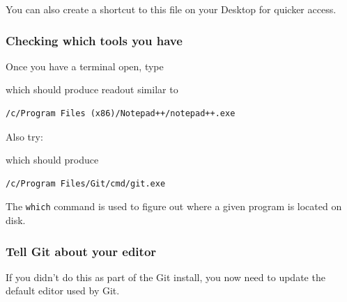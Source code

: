 You can also create a shortcut to this file on your Desktop for quicker
access.

\subsubsection{Checking which tools you
have}\label{checking-which-tools-you-have}

Once you have a terminal open, type

\begin{Shaded}
\begin{Highlighting}[]
 
\end{Highlighting}
\end{Shaded}

which should produce readout similar to

\begin{verbatim}
/c/Program Files (x86)/Notepad++/notepad++.exe
\end{verbatim}

Also try:

\begin{Shaded}
\begin{Highlighting}[]
 
\end{Highlighting}
\end{Shaded}

which should produce

\begin{verbatim}
/c/Program Files/Git/cmd/git.exe
\end{verbatim}

The \texttt{which} command is used to figure out where a given program
is located on disk.

\subsubsection{Tell Git about your
editor}\label{tell-git-about-your-editor}

If you didn't do this as part of the Git install, you now need to update
the default editor used by Git.

\begin{Shaded}
\begin{Highlighting}[]
 
\end{Highlighting}
\end{Shaded}


